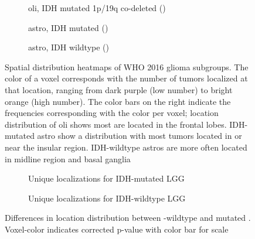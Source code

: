 \begin{figure}
    \centering
    \begin{subfigure}[b]{\textwidth}
        \centering
        \caption{\Gls{oli}, IDH mutated 1p/19q co-deleted ()}\label{fig:LGG_location_heatmap_IDH_mut_1p19q_codel}
    \end{subfigure}
    \begin{subfigure}[b]{\textwidth}
        \centering
        \caption{\Gls{astro}, IDH mutated ()}\label{fig:LGG_location_heatmap_IDH_mut_1p19q_intact}
    \end{subfigure}
    \begin{subfigure}[b]{\textwidth}
        \centering
        \caption{\Gls{astro}, IDH wildtype ()}\label{fig:LGG_location_heatmap_IDH_intact_1p19q_intact}
    \end{subfigure}
    \caption{Spatial distribution heatmaps of \acrshort{WHO} 2016 glioma subgroups. The color of a voxel corresponds with the number of \glspl{tumor} localized at that location, ranging from dark purple (low number) to bright orange (high number). The color bars on the right indicate the frequencies corresponding with the color per voxel;
     location distribution of \gls{oli} shows most are located in the frontal lobes.
     \acrshort{IDH}-mutated \gls{astro} show a distribution with most \glspl{tumor} located in or near the insular region.
     \acrshort{IDH}-wildtype \glspl{astro} are more often located in midline region and basal ganglia}\label{fig:LGG_location_heatmap_subgroups}
\end{figure}

\begin{figure}
    \centering
    \begin{subfigure}[b]{\textwidth}
        \caption{Unique localizations for \acrshort{IDH}-mutated \acrshort{LGG}}\label{fig:LGG_location_p_values_IDH_mut_vs_IDH_wt_mutated}
    \end{subfigure}
    \begin{subfigure}[b]{\textwidth}
        \caption{Unique localizations for \acrshort{IDH}-wildtype \acrshort{LGG}}\label{fig:LGG_location_p_values_IDH_mut_vs_IDH_wt_wt}
    \end{subfigure}

    \caption{Differences in location distribution between -wildtype and mutated . Voxel-color indicates corrected p-value with color bar for scale}\label{fig:LGG_location_P_values}
\end{figure}

